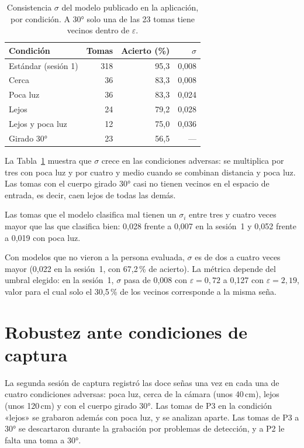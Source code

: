 \begin{table}[h]
    \centering
    \begin{tabular}{lrrr}
        \toprule
        Condición & Tomas & Acierto (\%) & $\sigma$ \\
        \midrule
        Estándar (sesión 1) & 318 & 95,3 & 0,008 \\
        Cerca & 36 & 83,3 & 0,008 \\
        Poca luz & 36 & 83,3 & 0,024 \\
        Lejos & 24 & 79,2 & 0,028 \\
        Lejos y poca luz & 12 & 75,0 & 0,036 \\
        Girado 30° & 23 & 56,5 & --- \\
        \bottomrule
    \end{tabular}
    \caption{Consistencia $\sigma$ del modelo publicado en la aplicación, por condición. A 30° solo una de las 23 tomas tiene vecinos dentro de $\varepsilon$.}
    \label{tab:sigma}
\end{table}

La Tabla~\ref{tab:sigma} muestra que $\sigma$ crece en las condiciones adversas: se multiplica por tres con poca luz y por cuatro y medio cuando se combinan distancia y poca luz. Las tomas con el cuerpo girado 30° casi no tienen vecinos en el espacio de entrada, es decir, caen lejos de todas las demás.

Las tomas que el modelo clasifica mal tienen un $\sigma_i$ entre tres y cuatro veces mayor que las que clasifica bien: 0,028 frente a 0,007 en la sesión~1 y 0,052 frente a 0,019 con poca luz.

Con modelos que no vieron a la persona evaluada, $\sigma$ es de dos a cuatro veces mayor (0,022 en la sesión~1, con 67,2\,\% de acierto). La métrica depende del umbral elegido: en la sesión~1, $\sigma$ pasa de 0,008 con $\varepsilon = 0{,}72$ a 0,127 con $\varepsilon = 2{,}19$, valor para el cual solo el 30,5\,\% de los vecinos corresponde a la misma seña.

\section{Robustez ante condiciones de captura}
\label{sec:res-robustez}

La segunda sesión de captura registró las doce señas una vez en cada una de cuatro condiciones adversas: poca luz, cerca de la cámara (unos 40\,cm), lejos (unos 120\,cm) y con el cuerpo girado 30°. Las tomas de P3 en la condición «lejos» se grabaron además con poca luz, y se analizan aparte. Las tomas de P3 a 30° se descartaron durante la grabación por problemas de detección, y a P2 le falta una toma a 30°.

